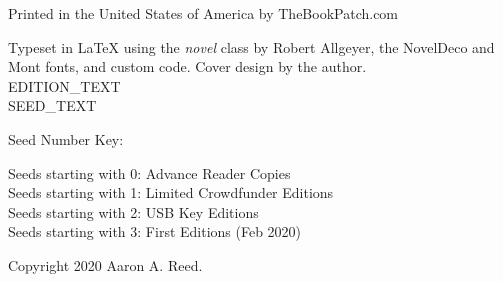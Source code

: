 \thispagestyle{empty}

\NewFontFamily{}
\vspace*{6\nbs}
\begin{center}
{\mont {}}
\end{center}
\clearpage

\thispagestyle{empty}
\null %
\clearpage

\thispagestyle{empty}
\vspace*{6\nbs}
\begin{center}
{\mont {}}

\vspace*{3\nbs}

{\mont {}}

\vfill
Printed in the United States of America by TheBookPatch.com 
\end{center}
\clearpage

\thispagestyle{empty}
\null\vfill

\begin{legalese}
Typeset in LaTeX using the \textit{novel} class by Robert Allgeyer, the NovelDeco and Mont fonts, and custom code. Cover design by the author. \\
\vspace{1\nbs}
EDITION_TEXT \\
\vspace{1\nbs}
SEED_TEXT \\

\vspace{1\nbs}

\begin{parascale}[0.88]
Seed Number Key: \\
\begin{adjustwidth}{2em}{2em}
Seeds starting with 0: Advance Reader Copies \\
Seeds starting with 1: Limited Crowdfunder Editions \\
Seeds starting with 2: USB Key Editions \\
Seeds starting with 3: First Editions (Feb 2020)
\end{adjustwidth}
\end{parascale}
\vspace{1\nbs}

Copyright 2020 Aaron A. Reed.
\end{legalese}
\clearpage

